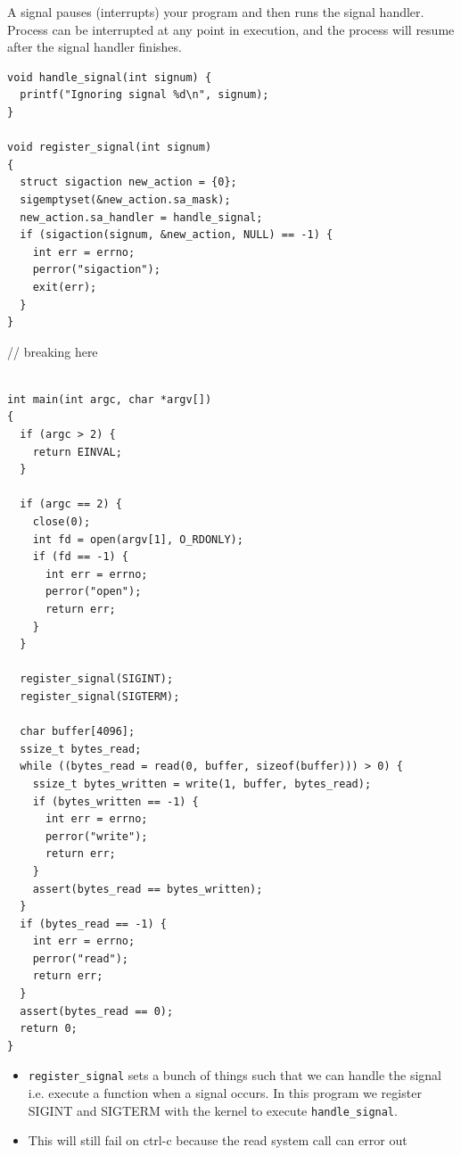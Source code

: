 \documentclass[../notes.tex]{subfiles}
\begin{document}
A signal pauses (interrupts) your program and then runs the signal handler. Process can be interrupted at any point in execution, and the process will resume after the signal handler finishes.


\begin{listing}[H]
\begin{verbatim}
void handle_signal(int signum) {
  printf("Ignoring signal %d\n", signum);
}

void register_signal(int signum)
{
  struct sigaction new_action = {0};
  sigemptyset(&new_action.sa_mask);
  new_action.sa_handler = handle_signal;
  if (sigaction(signum, &new_action, NULL) == -1) {
    int err = errno;
    perror("sigaction");
    exit(err);
  }
}

\end{verbatim}
\end{listing}

// breaking here

\begin{listing}[H]
\begin{verbatim}

int main(int argc, char *argv[])
{
  if (argc > 2) {
    return EINVAL;
  }

  if (argc == 2) {
    close(0);
    int fd = open(argv[1], O_RDONLY);
    if (fd == -1) {
      int err = errno;
      perror("open");
      return err;
    }
  }

  register_signal(SIGINT);
  register_signal(SIGTERM);

  char buffer[4096];
  ssize_t bytes_read;
  while ((bytes_read = read(0, buffer, sizeof(buffer))) > 0) {
    ssize_t bytes_written = write(1, buffer, bytes_read);
    if (bytes_written == -1) {
      int err = errno;
      perror("write");
      return err;
    }
    assert(bytes_read == bytes_written);
  }
  if (bytes_read == -1) {
    int err = errno;
    perror("read");
    return err;
  }
  assert(bytes_read == 0);
  return 0;
}
\end{verbatim}
\end{listing}

\begin{itemize}
    \item \texttt{register\_signal} sets a bunch of things such that we can handle the signal i.e. execute a function when a signal occurs. In this program we register SIGINT and SIGTERM with the kernel to execute \texttt{handle\_signal}. 
    \item This will still fail on ctrl-c because the read system call can error out
\end{itemize}
\end{document}

